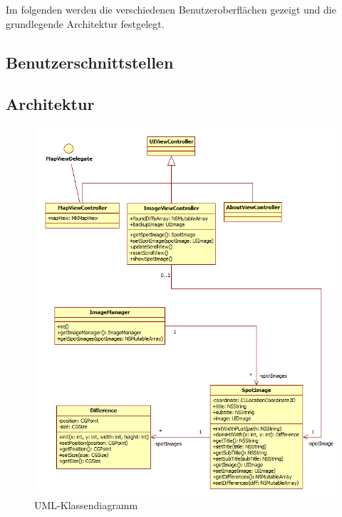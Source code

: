 Im folgenden werden die verschiedenen Benutzeroberflächen gezeigt und die grundlegende Architektur festgelegt.

\subsection{Benutzerschnittstellen}


\subsection{Architektur}

\begin{figure}[H]
  \centering
  \includegraphics[width=1.0\textwidth]{bilder/uml.png}
  \caption{UML-Klassendiagramm}
  \label{uml}
\end{figure}